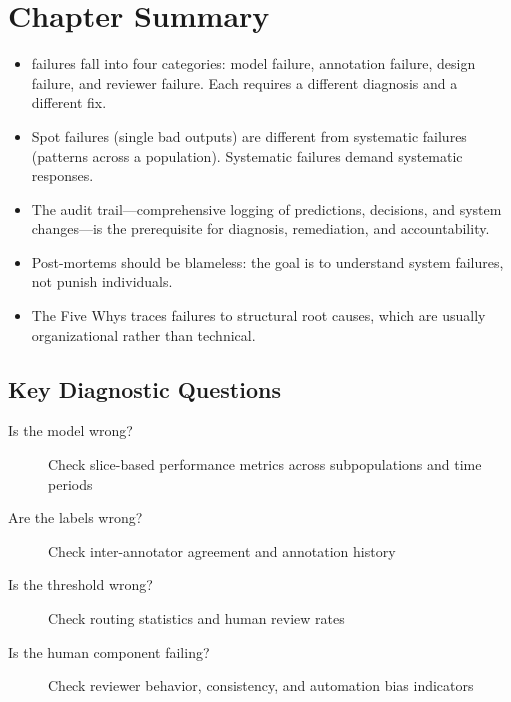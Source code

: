 \section*{Chapter Summary}

\begin{keyconcept}
\begin{itemize}
    \item \hitl failures fall into four categories: model failure, annotation failure, design failure, and reviewer failure. Each requires a different diagnosis and a different fix.
    \item Spot failures (single bad outputs) are different from systematic failures (patterns across a population). Systematic failures demand systematic responses.
    \item The audit trail---comprehensive logging of predictions, decisions, and system changes---is the prerequisite for diagnosis, remediation, and accountability.
    \item Post-mortems should be blameless: the goal is to understand system failures, not punish individuals.
    \item The Five Whys traces failures to structural root causes, which are usually organizational rather than technical.
\end{itemize}
\end{keyconcept}

\subsection*{Key Diagnostic Questions}

\begin{description}
    \item[Is the model wrong?] Check slice-based performance metrics across subpopulations and time periods
    \item[Are the labels wrong?] Check inter-annotator agreement and annotation history
    \item[Is the threshold wrong?] Check routing statistics and human review rates
    \item[Is the human component failing?] Check reviewer behavior, consistency, and automation bias indicators
\end{description}

